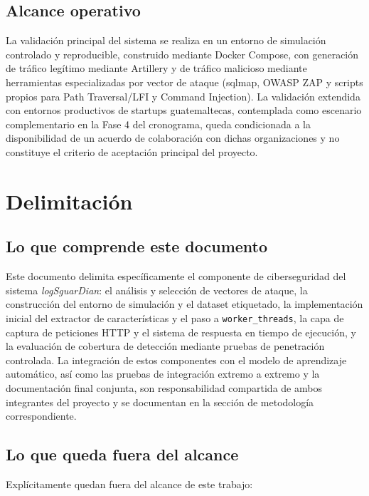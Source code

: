 \subsection{Alcance operativo}
\label{subsec:alcance-operativo}
La validación principal del sistema se realiza en un entorno de simulación controlado y
reproducible, construido mediante Docker Compose, con generación de tráfico legítimo mediante
Artillery y de tráfico malicioso mediante herramientas especializadas por vector de ataque
(sqlmap, OWASP ZAP y scripts propios para Path Traversal/LFI y Command Injection). La
validación extendida con entornos productivos de startups guatemaltecas, contemplada como
escenario complementario en la Fase 4 del cronograma, queda condicionada a la disponibilidad de
un acuerdo de colaboración con dichas organizaciones y no constituye el criterio de aceptación
principal del proyecto.

\section{Delimitación}

\subsection{Lo que comprende este documento}
Este documento delimita específicamente el componente de ciberseguridad del sistema
\textit{logSguarDian}: el análisis y selección de vectores de ataque, la construcción del entorno de
simulación y el dataset etiquetado, la implementación inicial del extractor de características y el paso a \texttt{worker\_threads}, la capa de captura de peticiones HTTP y el sistema de
respuesta en tiempo de ejecución, y la evaluación de cobertura de detección mediante pruebas de
penetración controlada. La integración de estos componentes con el modelo de aprendizaje
automático, así como las pruebas de integración extremo a extremo y la documentación final
conjunta, son responsabilidad compartida de ambos integrantes del proyecto y se documentan en
la sección de metodología correspondiente.

\subsection{Lo que queda fuera del alcance}
\label{subsec:fuera-alcance}
Explícitamente quedan fuera del alcance de este trabajo:

